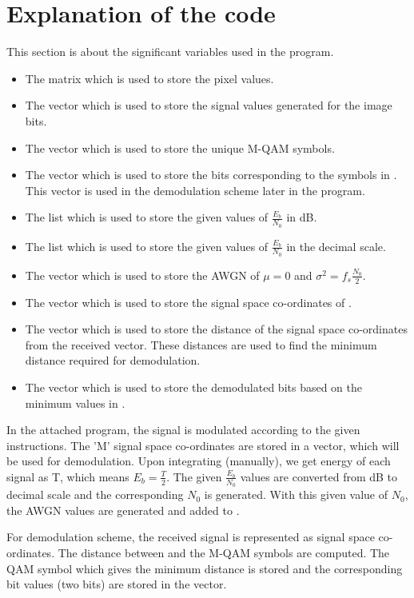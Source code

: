 \documentclass{article}
\begin{document}
\section{Explanation of the code}
{
    This section is about the significant variables used in the program.\newline
    \begin{itemize}
        \item {}\textrm{The matrix which is used to store the pixel values.}
        \item {}\textrm{The vector which is used to store the signal values generated for the image bits.}
        \item {}\textrm{The vector which is used to store the unique M-QAM symbols.}
        \item {}\textrm{The vector which is used to store the bits corresponding to the symbols in} \textrm{. This vector is used in the demodulation scheme later in the program.}
        \item {}\textrm{The list which is used to store the given values of \(\frac{E_b}{N_0}\) in dB}.
        \item {}\textrm{The list which is used to store the given values of \(\frac{E_b}{N_0}\) in the decimal scale.}
        \item {}\textrm{The vector which is used to store the AWGN of \(\mu = 0\) and \(\sigma^2 = f_s\frac{N_0}{2}\).}
        \item {}\textrm{The vector which is used to store the signal space co-ordinates of }.
        \item {}\textrm{The vector which is used to store the distance of the signal space co-ordinates from the received vector. These distances are used to find the minimum distance required for demodulation.}
        \item {}\textrm{The vector which is used to store the demodulated bits based on the minimum values in} .
        
    \end{itemize}
    
    In the attached program, the signal is modulated according to the given instructions. The 'M' signal space co-ordinates are stored in a vector, which will be used for demodulation. Upon integrating (manually), we get energy of each signal as T, which means \(E_b = \frac{T}{2}\). The given \(\frac{E_b}{N_0}\) values are converted from dB to decimal scale and the corresponding \(N_0\) is generated. With this given value of \(N_0\), the AWGN values are generated and added to . 
    
    \textrm{For demodulation scheme, the received signal is represented as signal space co-ordinates. The distance between }\textrm{ and the M-QAM symbols are computed. The QAM symbol which gives the minimum distance is stored and the corresponding bit values (two bits) are stored in the }\textrm{vector.}
}
\end{document}
